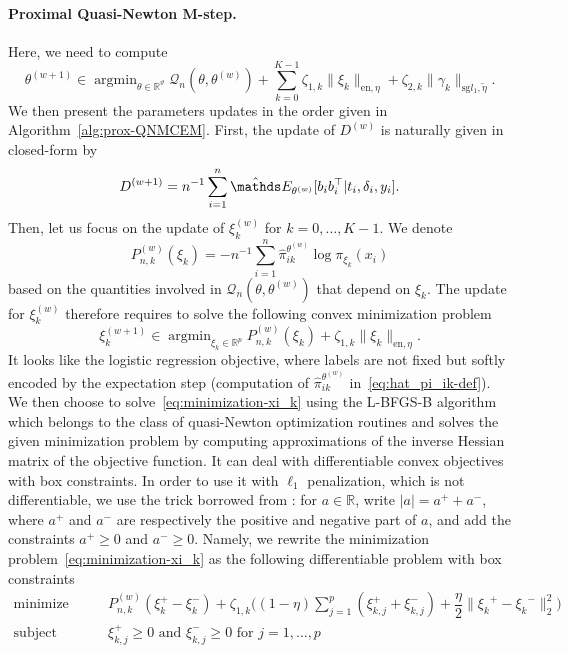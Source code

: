 \documentclass[11pt]{article}
\DeclareMathOperator{\argmin}{argmin}
\newcommand{\norm}[1]{\|#1\|}
\newcommand{\cQ}{\mathcal Q}
\newcommand{\R}{\mathds R}
\newcommand{\E}{\mathds E}
\begin{document}
\paragraph*{Proximal Quasi-Newton M-step.}
Here, we need to compute \[\theta^{(w+1)} \in \argmin_{\theta \in \R^\vartheta} \cQ_n(\theta, \theta^{(w)}) + \sum_{k=0}^{K-1} \zeta_{1,k} \norm{\xi_k}_{\text{en}, \eta} + \zeta_{2,k} \norm{\gamma_k}_{\text{sg} l_1, \tilde{\eta}}.\]
We then present the parameters updates in the order given in Algorithm~\ref{alg:prox-QNMCEM}.
First, the update of $D^{(w)}$ is naturally given in closed-form by
\begin{equation}
  \label{eq:update_D}
  D^{(w+1)} = n^{-1} \sum_{i=1}^n \hat \E_{\theta^{(w)}}[ b_i b_i^\top | t_i, \delta_i, y_i].
\end{equation}
Then, let us focus on the update of $\xi_k^{(w)}$ for $k=0, \ldots, K-1$. We denote
\[ P^{(w)}_{n,k}(\xi_k) = -n^{-1} \sum_{i=1}^n \hat \pi_{ik}^{\theta^{(w)}} \log \pi_{\xi_k}(x_i) \]
based on the quantities involved in $\cQ_n(\theta, \theta^{(w)})$ that depend on $\xi_k$. The update for $\xi_k^{(w)}$ therefore requires to solve the following convex minimization problem
\begin{equation}
  \label{eq:minimization-xi_k}
  \xi_k^{(w+1)} \in \argmin_{\xi_k \in \R^p} P^{(w)}_{n,k}(\xi_k) + \zeta_{1,k} \norm{\xi_k}_{\text{en}, \eta}.
\end{equation}
It looks like the logistic regression objective, where labels are not fixed but softly encoded by the expectation step (computation of $\hat \pi_{ik}^{\theta^{(w)}}$ in~\eqref{eq:hat_pi_ik-def}). We then choose to solve~\eqref{eq:minimization-xi_k} using the L-BFGS-B algorithm~\citep{zhu1997algorithm} which belongs to the class of quasi-Newton optimization routines and solves the given minimization problem by computing approximations
of the inverse Hessian matrix of the objective function. It can deal with differentiable convex objectives with box constraints.
In order to use it with $\ell_1$ penalization, which is not differentiable, we use the trick borrowed from \citet{andrew2007scalable}: for $a \in \R$, write $|a| = a^+ + a^-$, where $a^+$ and $a^-$ are respectively the positive and negative part of $a$, and add the constraints $a^+ \geq 0$ and $a^- \geq 0$.
Namely, we rewrite the minimization problem~\eqref{eq:minimization-xi_k} as the following differentiable problem with box constraints
\begin{equation}
  \label{eq:sub-problem-xi_k}
  \begin{split}
    \text{minimize}& \quad \quad P_{n, k}^{(w)}(\xi_k^+ - \xi_k^-) + \zeta_{1,k} \big((1 - \eta) \sum_{j=1}^p (\xi_{k,j}^+ + \xi_{k,j}^-) + \dfrac \eta 2 \norm{{\xi_k}^+ - {\xi_k}^-}_2^2 \big) \\
    \text{subject to}& \quad \quad \xi_{k,j}^+ \geq 0 \text{ and } \xi_{k,j}^- \geq 0 \text{ for } j = 1, \ldots, p
  \end{split} 
\end{equation}
\end{document}
